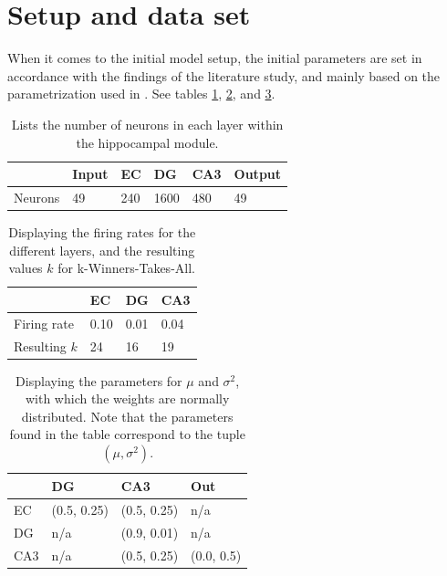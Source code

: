 \section{Setup and data set}

When it comes to the initial model setup, the initial parameters are set in accordance with the findings of the literature study, and mainly based on the parametrization used in \citep{Hattori2010, Hattori2014, Wakagi2008}. See tables \ref{table:number_of_neurons}, \ref{table:firing_rates}, and \ref{table:initial_weight_distributions}.

\begin{table}
\centering
\caption{Lists the number of neurons in each layer within the hippocampal module.}
\label{table:number_of_neurons}
\begin{tabular}{l|l|l|l|l|l|}
\cline{2-6}
                              & Input & EC  & DG   & CA3 & Output \\ \hline
\multicolumn{1}{|l|}{Neurons} & 49    & 240 & 1600 & 480 & 49     \\ \hline
\end{tabular}
\end{table}

\begin{table}
\centering
\caption{Displaying the firing rates for the different layers, and the resulting values $k$ for k-Winners-Takes-All.}
\label{table:firing_rates}
\begin{tabular}{l|l|l|l|}
\cline{2-4}
                                  & EC   & DG   & CA3  \\ \hline
\multicolumn{1}{|l|}{Firing rate} & 0.10 & 0.01 & 0.04 \\ \hline
\multicolumn{1}{|l|}{Resulting $k$} & 24 & 16 & 19 \\ \hline
\end{tabular}
\end{table}

\begin{table}[]
\centering
\caption{Displaying the parameters for $\mu$ and $\sigma^2$, with which the weights are normally distributed. Note that the parameters found in the table correspond to the tuple $(\mu, \sigma^2)$.}
\label{table:initial_weight_distributions}
\begin{tabular}{l|l|l|l|}
\cline{2-4}
                          & DG        & CA3       & Out      \\ \hline
\multicolumn{1}{|l|}{EC}  & (0.5, 0.25) & (0.5, 0.25) & n/a      \\ \hline
\multicolumn{1}{|l|}{DG}  & n/a       & (0.9, 0.01) & n/a      \\ \hline
\multicolumn{1}{|l|}{CA3} & n/a       & (0.5, 0.25) & (0.0, 0.5) \\ \hline
\end{tabular}
\end{table}


